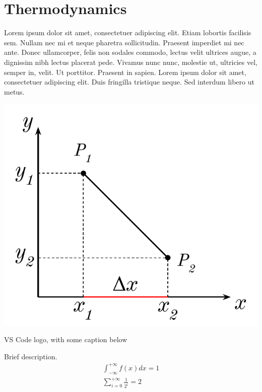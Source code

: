 
\section{Thermodynamics}
\marginpar{\minitoc}


Lorem ipsum dolor sit amet, consectetuer adipiscing elit. Etiam lobortis facilisis
sem. Nullam nec mi et neque pharetra sollicitudin. Praesent imperdiet mi nec
ante. Donec ullamcorper, felis non sodales commodo, lectus velit ultrices augue,
a dignissim nibh lectus placerat pede. Vivamus nunc nunc, molestie ut, ultricies
vel, semper in, velit. Ut porttitor. Praesent in sapien. Lorem ipsum dolor sit
amet, consectetuer adipiscing elit. Duis fringilla tristique neque. Sed interdum
libero ut metus. 


\begin{marginfigure}
  \centering
  \includegraphics[width = \marginparwidth]{figures/moto.pdf}
  \caption{VS Code logo, with some caption below}
\end{marginfigure}

\vspace*{0.2cm}
\begin{tcolorbox}[colback = yellow!30, colframe = yellow!30!black, title = {Some equations}]
Brief description.
  \begin{align}
  \int_{-\infty}^{+\infty}f(x)dx = 1\label{integrale}\\
  \sum_{i = 0}^{+\infty} \frac{1}{2^i} = 2\label{sommatoria}
\end{align}

\end{tcolorbox}


